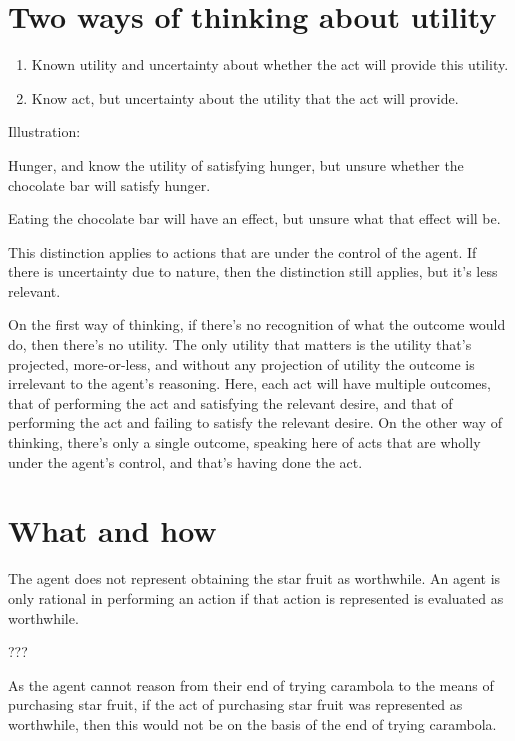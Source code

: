 \documentclass[10pt]{article}
\begin{document}
\newpage

\section{Two ways of thinking about utility}
\label{sec:two-ways-thinking}

\begin{enumerate}[label=\Alph*)]
\item Known utility and uncertainty about whether the act will provide this utility.
\item Know act, but uncertainty about the utility that the act will provide.
\end{enumerate}

Illustration:

Hunger, and know the utility of satisfying hunger, but unsure whether the chocolate bar will satisfy hunger.

Eating the chocolate bar will have an effect, but unsure what that effect will be.

This distinction applies to actions that are under the control of the agent.
If there is uncertainty due to nature, then the distinction still applies, but it's less relevant.

On the first way of thinking, if there's no recognition of what the outcome would do, then there's no utility.
The only utility that matters is the utility that's projected, more-or-less, and without any projection of utility the outcome is irrelevant to the agent's reasoning.
Here, each act will have multiple outcomes, that of performing the act and satisfying the relevant desire, and that of performing the act and failing to satisfy the relevant desire.
On the other way of thinking, there's only a single outcome, speaking here of acts that are wholly under the agent's control, and that's having done the act.

\newpage

\section{What and how}
\label{sec:what-how}

The agent does not represent obtaining the star fruit as worthwhile.
An agent is only rational in performing an action if that action is represented is evaluated as worthwhile.

???

As the agent cannot reason from their end of trying carambola to the means of purchasing star fruit, if the act of purchasing star fruit was represented as worthwhile, then this would not be on the basis of the end of trying carambola.
\end{document}
